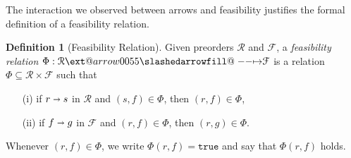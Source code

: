 \documentclass[12pt]{article}
\makeatletter
\theoremstyle{definition}
\newtheorem{definition}{Definition}[section]
\theoremstyle{plain}
\theoremstyle{plain}
\theoremstyle{plain}
\theoremstyle{plain}
\theoremstyle{remark}
\theoremstyle{remark}
\newcommand{\mc}[1]{\mathcal{#1}}
\newcommand{\sub}{\subseteq}
\newcommand{\true}{\mathtt{true}}
\def\slashedarrowfill@#1#2#3#4#5{%
	$\m@th\thickmuskip0mu\medmuskip\thickmuskip\thinmuskip\thickmuskip
	\relax#5#1\mkern-7mu%
	\cleaders\hbox{$#5\mkern-2mu#2\mkern-2mu$}\hfill
	\mathclap{#3}\mathclap{#2}%
	\cleaders\hbox{$#5\mkern-2mu#2\mkern-2mu$}\hfill
	\mkern-7mu#4$%
}
\def\rightslashedarrowfill@{%
	\slashedarrowfill@\relbar\relbar\mapstochar\rightarrow}
\newcommand\xslashedrightarrow[2][]{%
	\ext@arrow 0055{\rightslashedarrowfill@}{#1}{#2}}
\makeatother
\begin{document}
The interaction we observed between arrows and feasibility justifies the formal definition of a feasibility relation.

\begin{definition}[Feasibility Relation]\label{def:feasibility}
	Given preorders $\mc{R}$ and $\mc{F}$, a \emph{feasibility relation} $\Phi: \mc{R} \xslashedrightarrow{} \mc{F}$ is a relation $\Phi \sub \mc{R} \times \mc{F}$ such that
	\begin{itemize}
		\item[(i)] if $r \shortrightarrow s$ in $\mc{R}$ and $(s,f) \in \Phi$, then $(r,f) \in \Phi$,
		\item[(ii)] if $f \shortrightarrow g$ in $\mc{F}$ and $(r,f) \in \Phi$, then $(r,g) \in \Phi$.
	\end{itemize}
	Whenever $(r,f) \in \Phi$, we write $\Phi(r,f) = \true$ and say that $\Phi(r,f)$ holds.
\end{definition}
\end{document}
